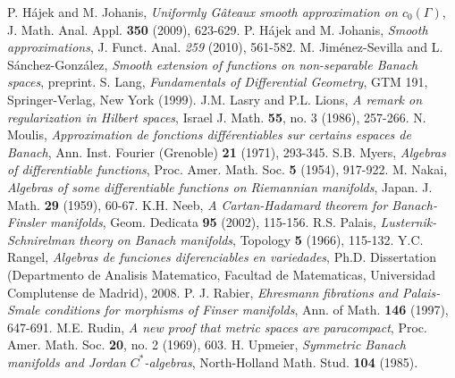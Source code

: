 \documentclass[11pt]{amsart}
\numberwithin{equation}{section}
\begin{document}
\begin{thebibliography}{998}
 P. H\'ajek and M. Johanis, \emph{Uniformly G\^ateaux smooth approximation on $c_0(\Gamma)$}, J. Math. Anal. Appl. \textbf{350} (2009), 623-629.
 P. H\'ajek and M. Johanis, \emph{Smooth approximations}, J. Funct. Anal. \emph{259} (2010), 561-582.
 M. Jim\'enez-Sevilla and L. S\'anchez-Gonz\'alez, \emph{Smooth extension of functions on non-separable Banach spaces}, preprint.
 S. Lang, \emph{Fundamentals of Differential Geometry}, GTM 191, Springer-Verlag, New York (1999).
 J.M. Lasry and P.L. Lions, \emph{A remark on regularization in Hilbert spaces}, Israel J. Math. \textbf{55}, no. 3 (1986), 257-266.
 N. Moulis, \emph{Approximation de fonctions diff\'erentiables sur certains espaces de Banach}, Ann. Inst. Fourier (Grenoble) \textbf{21} (1971), 293-345.
  S.B. Myers, \emph{Algebras of differentiable functions}, Proc. Amer. Math. Soc. \textbf{5} (1954), 917-922.
 M. Nakai, \emph{Algebras of some differentiable functions on Riemannian manifolds}, Japan. J. Math. \textbf{29} (1959), 60-67.
 K.H. Neeb, \emph{A Cartan-Hadamard theorem for Banach-Finsler manifolds}, Geom. Dedicata \textbf{95} (2002), 115-156.
 R.S. Palais, \emph{Lusternik-Schnirelman theory on Banach manifolds}, Topology  \textbf{5} (1966), 115-132.
 Y.C. Rangel, \emph{Algebras de funciones diferenciables en variedades}, Ph.D. Dissertation (Departmento de Analisis Matematico, Facultad de Matematicas, Universidad Complutense de Madrid),  2008.
 P. J. Rabier, \emph{Ehresmann fibrations and Palais-Smale conditions for morphisms of Finser manifolds}, Ann. of Math.  \textbf{146} (1997), 647-691.
 M.E. Rudin, \emph{A new proof that metric spaces are paracompact}, Proc. Amer. Math. Soc. \textbf{20}, no. 2 (1969), 603.
 H. Upmeier, \emph{Symmetric Banach manifolds and Jordan  $C^*$-algebras}, North-Holland Math. Stud. \textbf{104} (1985).
\end{thebibliography}
\end{document}
